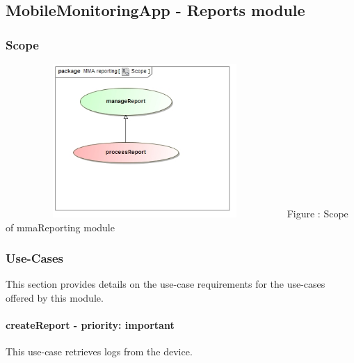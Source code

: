 \documentclass[hidelinks, 12pt, oneside]{article}
\begin{document}
	
	\subsection{MobileMonitoringApp - Reports module}
	\subsubsection{Scope}
	\includegraphics[width=400px,height=220px]{img/ScopeReporting.jpg}
			Figure : Scope of mmaReporting module
	\subsubsection{Use-Cases}
			This section provides details on the use-case requirements for the use-cases offered by this module.
		\paragraph{ createReport - priority: important}
		This use-case retrieves logs from the device.
\end{document}
